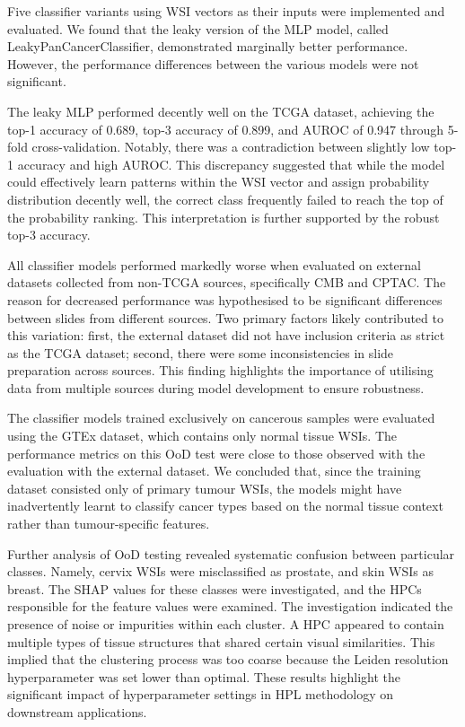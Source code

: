 \documentclass{l4proj}
\begin{document}
Five classifier variants using WSI vectors as their inputs were implemented and evaluated. We found that the leaky version of the MLP model, called LeakyPanCancerClassifier, demonstrated marginally better performance. However, the performance differences between the various models were not significant.

The leaky MLP performed decently well on the TCGA dataset, achieving the top-1 accuracy of 0.689, top-3 accuracy of 0.899, and AUROC of 0.947 through 5-fold cross-validation. Notably, there was a contradiction between slightly low top-1 accuracy and high AUROC. This discrepancy suggested that while the model could effectively learn patterns within the WSI vector and assign probability distribution decently well, the correct class frequently failed to reach the top of the probability ranking. This interpretation is further supported by the robust top-3 accuracy.

All classifier models performed markedly worse when evaluated on external datasets collected from non-TCGA sources, specifically CMB and CPTAC. The reason for decreased performance was hypothesised to be significant differences between slides from different sources. Two primary factors likely contributed to this variation: first, the external dataset did not have inclusion criteria as strict as the TCGA dataset; second, there were some inconsistencies in slide preparation across sources. This finding highlights the importance of utilising data from multiple sources during model development to ensure robustness.

The classifier models trained exclusively on cancerous samples were evaluated using the GTEx dataset, which contains only normal tissue WSIs. The performance metrics on this OoD test were close to those observed with the evaluation with the external dataset. We concluded that, since the training dataset consisted only of primary tumour WSIs, the models might have inadvertently learnt to classify cancer types based on the normal tissue context rather than tumour-specific features.

Further analysis of OoD testing revealed systematic confusion between particular classes. Namely, cervix WSIs were misclassified as prostate, and skin WSIs as breast. The SHAP values for these classes were investigated, and the HPCs responsible for the feature values were examined. The investigation indicated the presence of noise or impurities within each cluster. A HPC appeared to contain multiple types of tissue structures that shared certain visual similarities. This implied that the clustering process was too coarse because the Leiden resolution hyperparameter was set lower than optimal. These results highlight the significant impact of hyperparameter settings in HPL methodology on downstream applications.
\end{document}
